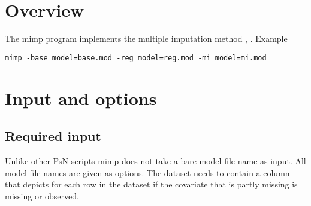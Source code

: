 



\maketitle
\newcommand{\guidetoolname}{mimp}


\section{Overview}
The mimp program implements the multiple imputation method \cite{Johansson1}, \cite{Johansson2}.
Example
\begin{verbatim}
mimp -base_model=base.mod -reg_model=reg.mod -mi_model=mi.mod
\end{verbatim}

\section{Input and options}

\subsection{Required input}
Unlike other PsN scripts mimp does not take a bare model file name as input. All model file names are given as options. The dataset needs to contain a column that depicts for each row in the dataset if the covariate that is partly missing is missing or observed.

